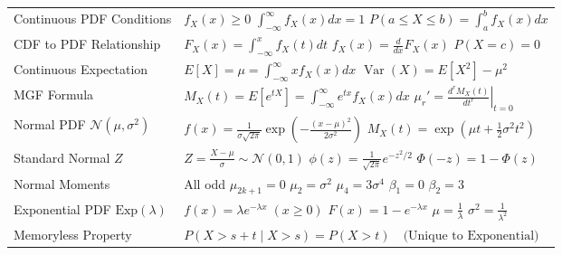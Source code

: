 \documentclass[12pt,a4paper]{article}
\renewcommand{\arraystretch}{1.45}
\begin{document}
\begin{tcolorbox}[formulabox, title={\textbf{Key Formulas and Continuous Distribution Densities at a Glance}}]
\renewcommand{\arraystretch}{1.35}
\setlength{\tabcolsep}{5pt}
\noindent\begin{tabularx}{\linewidth}{B{3.5cm} Y}
Continuous PDF Conditions & $f_X(x) \ge 0$ \newline $\int_{-\infty}^\infty f_X(x) dx = 1$ \newline $P(a \le X \le b) = \int_a^b f_X(x) dx$ \\[3pt]
CDF to PDF Relationship & $F_X(x) = \int_{-\infty}^x f_X(t) dt$ \newline $f_X(x) = \frac{d}{dx}F_X(x)$ \newline $P(X = c) = 0$ \\[3pt]
Continuous Expectation & $E[X] = \mu = \int_{-\infty}^\infty x f_X(x) dx$ \newline $\operatorname{Var}(X) = E[X^2] - \mu^2$ \\[3pt]
MGF Formula & $M_X(t) = E[e^{tX}] = \int_{-\infty}^\infty e^{tx} f_X(x) dx$ \newline $\mu_r' = \left.\frac{d^r M_X(t)}{dt^r}\right|_{t=0}$ \\[3pt]
Normal PDF $\mathcal{N}(\mu, \sigma^2)$ & $f(x) = \frac{1}{\sigma\sqrt{2\pi}} \exp\left(-\frac{(x-\mu)^2}{2\sigma^2}\right)$ \newline $M_X(t) = \exp\left(\mu t + \frac{1}{2}\sigma^2 t^2\right)$ \\[3pt]
Standard Normal $Z$ & $Z = \frac{X-\mu}{\sigma} \sim \mathcal{N}(0, 1)$ \newline $\phi(z) = \frac{1}{\sqrt{2\pi}} e^{-z^2/2}$ \newline $\Phi(-z) = 1-\Phi(z)$ \\[3pt]
Normal Moments & All odd $\mu_{2k+1} = 0$ \newline $\mu_2 = \sigma^2$ \newline $\mu_4 = 3\sigma^4$ \newline $\beta_1 = 0$ \quad $\beta_2 = 3$ \\[3pt]
Exponential PDF $\text{Exp}(\lambda)$ & $f(x) = \lambda e^{-\lambda x} \; (x \ge 0)$ \newline $F(x) = 1 - e^{-\lambda x}$ \newline $\mu = \frac{1}{\lambda}$ \newline $\sigma^2 = \frac{1}{\lambda^2}$ \\[3pt]
Memoryless Property & $P(X > s+t \mid X > s) = P(X > t) \quad \text{(Unique to Exponential)}$ \\[3pt]

\end{tabularx}
\end{tcolorbox}
\end{document}
